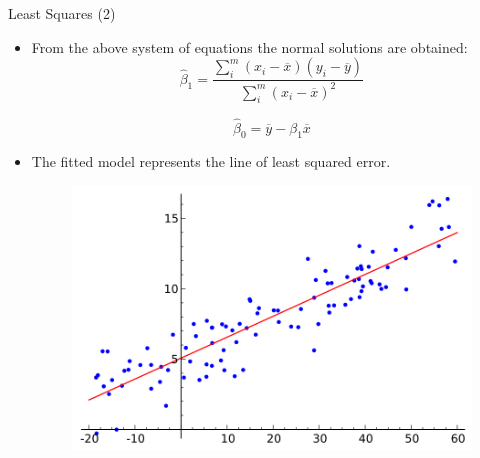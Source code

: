 \documentclass[handout]{beamer}
\begin{document}
\begin{frame}{Least Squares (2)}
\scriptsize{
\begin{itemize}
 \item From the above system of equations the normal solutions are obtained:
  \begin{equation}
 \hat{\beta}_{1} = \frac{\sum_{i}^{m} (x_i-\overline{x})(y_i-\overline{y}) }{ \sum_{i}^{m} (x_i-\overline{x})^2}    
 \end{equation}

 \begin{equation}
 \hat{\beta}_{0} = \overline{y} -\beta_{1}\overline{x}    
 \end{equation}



\item The fitted model represents the line of least squared error.

\begin{figure}[h!]
	\centering
	\includegraphics[scale=0.35]{pics/Linear_regression.png}
\end{figure}

\end{itemize}

} 
 
\end{frame}
\end{document}
